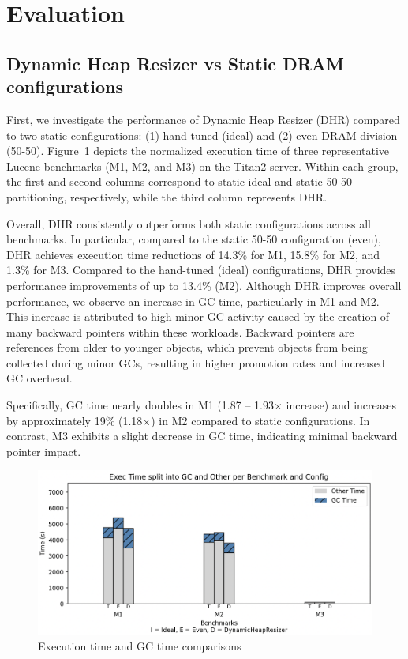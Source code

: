 \section{Evaluation}
\subsection{Dynamic Heap Resizer vs Static DRAM configurations}
First, we investigate the performance of Dynamic Heap Resizer (DHR) compared to
two static configurations: (1) hand-tuned (ideal) and (2) even DRAM division
(50-50). Figure~\ref{fig:gc_exec_time} depicts the normalized execution time of
three representative Lucene benchmarks (M1, M2, and M3) on the Titan2 server.
Within each group, the first and second columns correspond to static ideal and
static 50-50 partitioning, respectively, while the third column represents DHR.

Overall, DHR consistently outperforms both static configurations across all
benchmarks. In particular, compared to the static 50-50 configuration (even),
DHR achieves execution time reductions of 14.3\% for M1, 15.8\% for M2, and
1.3\% for M3. Compared to the hand-tuned (ideal) configurations, DHR provides
performance improvements of up to 13.4\% (M2). Although DHR improves overall
performance, we observe an increase in GC time, particularly in M1 and M2. This
increase is attributed to high minor GC activity caused by the creation of many
backward pointers within these workloads. Backward pointers are references from
older to younger objects, which prevent objects from being collected during
minor GCs, resulting in higher promotion rates and increased GC overhead.

Specifically, GC time nearly doubles in M1 (1.87 -- 1.93$\times$ increase) and
increases by approximately 19\% (1.18×) in M2 compared to static configurations.
In contrast, M3 exhibits a slight decrease in GC time, indicating minimal
backward pointer impact.

\begin{figure}[htbp]
  \centering
  \includegraphics[width=1\columnwidth]{fig/eval_graph.png}
  \caption{Execution time and GC time comparisons}
  \label{fig:gc_exec_time}
\end{figure}


